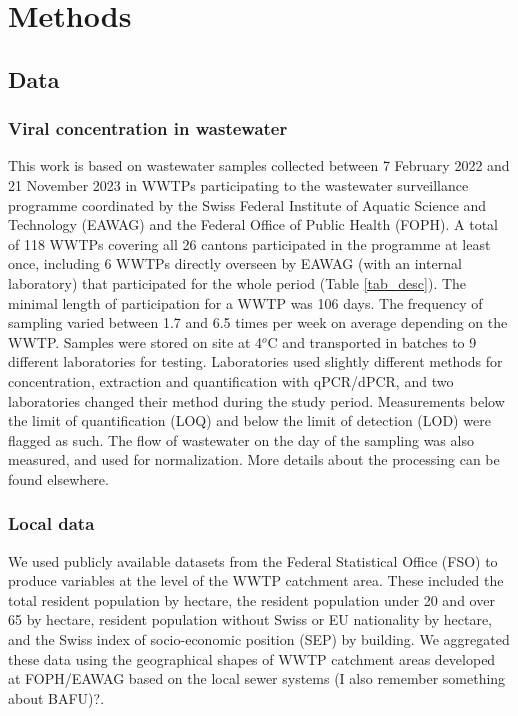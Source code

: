 \documentclass[10pt,letterpaper]{article}
\begin{document}
\section{Methods}

\subsection{Data}

\subsubsection{Viral concentration in wastewater}

This work is based on wastewater samples collected between 7 February 2022 and 21 November 2023 in WWTPs participating to the wastewater surveillance programme coordinated by the Swiss Federal Institute of Aquatic Science and Technology (EAWAG) and the Federal Office of Public Health (FOPH).
A total of 118 WWTPs covering all 26 cantons participated in the programme at least once, including 6 WWTPs directly overseen by EAWAG (with an internal laboratory) that participated for the whole period (Table \ref{tab_desc}).
The minimal length of participation for a WWTP was 106 days.
The frequency of sampling varied between 1.7 and 6.5 times per week on average depending on the WWTP.
Samples were stored on site at 4$^o$C and transported in batches to 9 different laboratories for testing.
Laboratories used slightly different methods for concentration, extraction and quantification with qPCR/dPCR, and two laboratories changed their method during the study period.
Measurements below the limit of quantification (LOQ) and below the limit of detection (LOD) were flagged as such.
The flow of wastewater on the day of the sampling was also measured, and used for normalization.
More details about the processing can be found elsewhere\cite{nadeauInfluenzaTransmissionDynamics2024}.

\subsubsection{Local data}

We used publicly available datasets from the Federal Statistical Office (FSO) to produce variables at the level of the WWTP catchment area.
These included the total resident population by hectare, the resident population under 20 and over 65 by hectare, resident population without Swiss or EU nationality by hectare, and the Swiss index of socio-economic position (SEP) by building.
We aggregated these data using the geographical shapes of WWTP catchment areas developed at FOPH/EAWAG based on the local sewer systems (I also remember something about BAFU)?.
\end{document}
